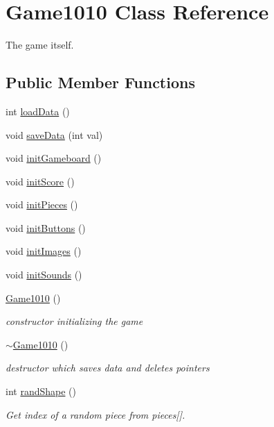 \hypertarget{class_game1010}{}\section{Game1010 Class Reference}
\label{class_game1010}


The game itself.  


\subsection*{Public Member Functions}
\begin{DoxyCompactItemize}
\item 
int \mbox{\hyperlink{class_game1010_a3dbbf957de5309f1e7f3d6008f948176}{load\+Data}} ()
\item 
void \mbox{\hyperlink{class_game1010_a72900d1043c4d40f953c584a9d9cb6c8}{save\+Data}} (int val)
\item 
void \mbox{\hyperlink{class_game1010_aee1b07231495b0a78a77b6f04c07a848}{init\+Gameboard}} ()
\item 
void \mbox{\hyperlink{class_game1010_a90378af973c32816055e49bacc59a7de}{init\+Score}} ()
\item 
void \mbox{\hyperlink{class_game1010_a510e064a35ea16a5582ebe311a0131a7}{init\+Pieces}} ()
\item 
void \mbox{\hyperlink{class_game1010_a94c89079a87b30e7f4813d40283dd4ad}{init\+Buttons}} ()
\item 
void \mbox{\hyperlink{class_game1010_a3726442b01642369347347eff645830e}{init\+Images}} ()
\item 
void \mbox{\hyperlink{class_game1010_a995a153a4f9639b989d605078f6c1ac2}{init\+Sounds}} ()
\item 
\mbox{\hyperlink{class_game1010_a0a0688219844edbe8f4a44c11a13e32a}{Game1010}} ()
\begin{DoxyCompactList}\small\item\em constructor initializing the game \end{DoxyCompactList}\item 
\mbox{\hyperlink{class_game1010_abcdf29a3fb425ad389e247f241ee4ed5}{$\sim$\+Game1010}} ()
\begin{DoxyCompactList}\small\item\em destructor which saves data and deletes pointers \end{DoxyCompactList}\item 
int \mbox{\hyperlink{class_game1010_a9af7a5b3b193d6edbefc969b1d756c94}{rand\+Shape}} ()
\begin{DoxyCompactList}\small\item\em Get index of a random piece from pieces\mbox{[}\mbox{]}. \end{DoxyCompactList}\item 

\end{DoxyCompactItemize}
